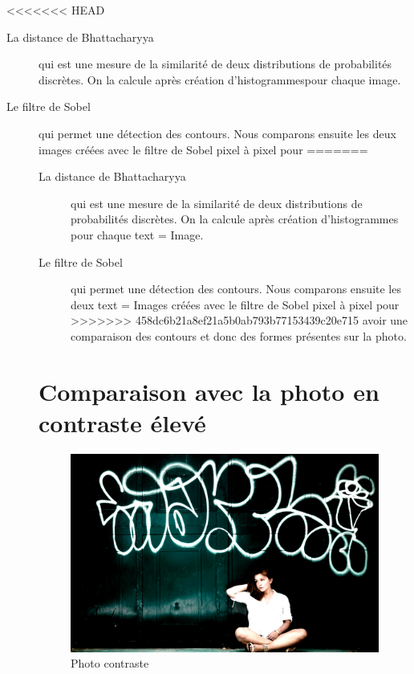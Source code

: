 \documentclass[]{article}
\begin{document}
<<<<<<< HEAD
\begin{description}  
\item[La distance de Bhattacharyya] qui est une mesure de la similarité de deux 
  distributions de probabilités discrètes. On la calcule après création 
  d'histogrammespour chaque image.
\item[Le filtre de Sobel] qui permet une détection des contours. Nous comparons
  ensuite les deux images créées avec le filtre de Sobel pixel à pixel pour
=======
\begin{description}
\item[La distance de Bhattacharyya] qui est une mesure de la similarité de deux
  distributions de probabilités discrètes. On la calcule après création
  d'histogrammes pour chaque text = Image.
\item[Le filtre de Sobel] qui permet une détection des contours. Nous comparons
  ensuite les deux text = Images créées avec le filtre de Sobel pixel à pixel pour
>>>>>>> 458dc6b21a8ef21a5b0ab793b77153439c20e715
  avoir une comparaison des contours et donc des formes présentes sur la photo.
\end{description}

\newpage

\section{Comparaison avec la photo en contraste
élevé}\label{comparaison-avec-la-photo-en-contraste-uxe9levuxe9}

\begin{figure}[htbp]
\centering
\includegraphics{photos/contraste.jpg}
\caption{Photo contraste}
\end{figure}


\end{description}
\end{document}
